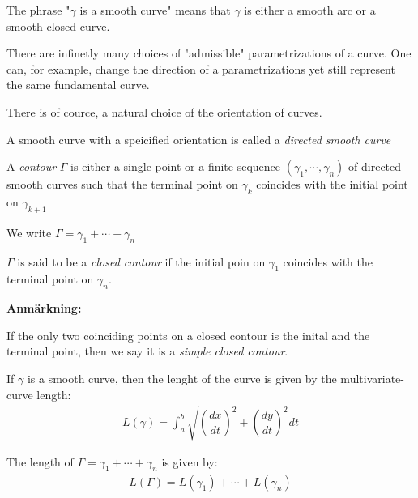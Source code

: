 \noindent The phrase "$\gamma$ is a smooth curve" means that $\gamma$ is either a smooth arc or a smooth closed curve. 
\par\bigskip
\noindent There are infinetly many choices of "admissible" parametrizations of a curve. One can, for example, change the direction of a parametrizations yet still represent the same fundamental curve. 
\par\bigskip
\noindent There is of cource, a natural choice of the orientation of curves.
\par\bigskip
\begin{theo}{}
  A smooth curve with a speicified orientation is called a \textit{directed smooth curve}
\end{theo}
\par\bigskip
\begin{theo}[Contour]{}
  A \textit{contour} $\Gamma$ is either a single point or a finite sequence $(\gamma_1,\cdots,\gamma_n)$ of directed smooth curves such that the terminal point on $\gamma_k$  coincides with the initial point on $\gamma_{k+1}$
  \par\bigskip
  \noindent We write $\Gamma = \gamma_1+\cdots+\gamma_n$
\end{theo}
\par\bigskip
\begin{theo}{}
  $\Gamma$ is said to be a \textit{closed contour} if the initial poin on $\gamma_1$ coincides with the terminal point on $\gamma_n$. 
\end{theo}
\par\bigskip
\noindent\textbf{Anmärkning:}\par
\noindent If the only two coinciding points on a closed contour is the inital and the terminal point, then we say it is a \textit{simple closed contour}.
\newpage
\begin{theo}{}
  If $\gamma$ is a smooth curve, then the lenght of the curve is given by the multivariate-curve length:
  \begin{equation*}
    \begin{gathered}
      L(\gamma) = \int_{a}^{b}\sqrt{\left(\dfrac{dx}{dt}\right)^2+\left(\dfrac{dy}{dt}\right)^2}dt
    \end{gathered}
  \end{equation*}
\end{theo}
\par\bigskip
\noindent The length of $\Gamma = \gamma_1+\cdots+\gamma_n$ is given by:
\begin{equation*}
  \begin{gathered}
    L(\Gamma) = L(\gamma_1)+\cdots+L(\gamma_n)
  \end{gathered}
\end{equation*}
\par\bigskip
